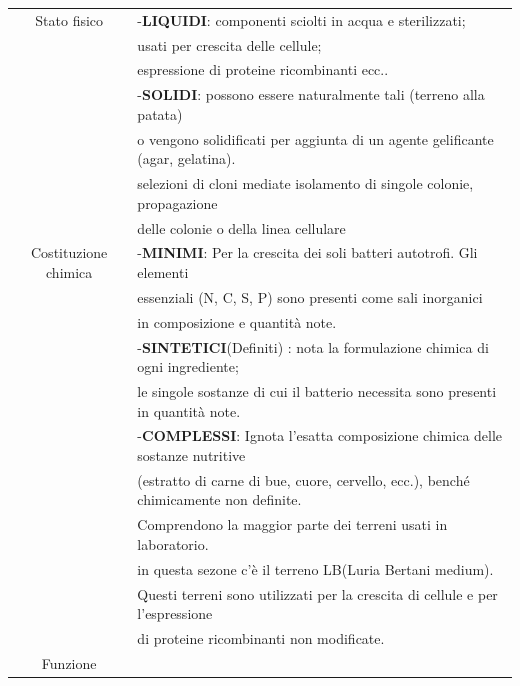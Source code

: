 \begin{tabular}{ll}
\hline
\multicolumn{1}{c}{Stato fisico}

& -\textbf{LIQUIDI}: componenti sciolti in acqua e sterilizzati; \\ \cline{1-1} &usati per crescita delle cellule;\\&  espressione di proteine ricombinanti ecc..\\

& -\textbf{SOLIDI}:  possono essere naturalmente tali (terreno alla patata)\\ & o vengono solidificati per aggiunta di un agente gelificante (agar, gelatina). \\ &selezioni di cloni mediate isolamento di
singole colonie, propagazione \\ & delle colonie o della linea cellulare \\

\hline
\multicolumn{1}{c}{Costituzione chimica}

& -\textbf{MINIMI}: Per la crescita dei soli batteri autotrofi. Gli elementi \\ \cline{1-1} & essenziali (N, C, S, P) sono presenti come sali inorganici\\ & in composizione e quantità note.\\
& -\textbf{SINTETICI}(Definiti) : nota la formulazione chimica di ogni ingrediente; \\ & le singole sostanze di cui il batterio necessita sono presenti in quantità note.\\
& -\textbf{COMPLESSI}: Ignota l’esatta composizione chimica delle sostanze nutritive \\ & (estratto di carne di bue, cuore, cervello, ecc.), benché chimicamente non definite.\\ & Comprendono la maggior parte dei terreni usati in laboratorio. \\ & in  questa sezone c'è il terreno LB(Luria Bertani medium).\\ &  Questi terreni sono utilizzati per la crescita di cellule e per l’espressione
\\ & di proteine ricombinanti non modificate.\\

\hline
\multicolumn{1}{c}{Funzione}


\end{tabular}
